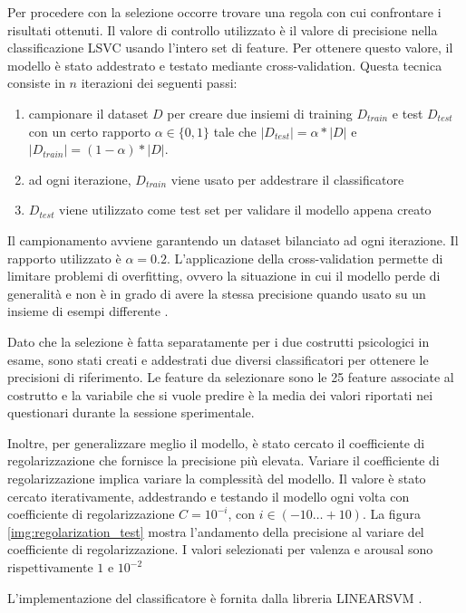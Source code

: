 Per procedere con la selezione occorre trovare una regola con cui confrontare i risultati ottenuti. Il valore di controllo utilizzato è il valore di precisione nella classificazione LSVC usando l'intero set di feature. Per ottenere questo valore, il modello è stato addestrato e testato mediante cross-validation. Questa tecnica consiste in $n$ iterazioni dei seguenti passi:
\begin{enumerate}
    \item campionare il dataset $D$ per creare due insiemi di training $D_{train}$ e test $D_{test}$ con un certo rapporto $\alpha \in\{0,1\}$ tale che $|D_{test}| = \alpha * |D|$ e $|D_{train}| = (1-\alpha) * |D|$.
    \item ad ogni iterazione, $D_{train}$ viene usato per addestrare il classificatore
    \item $D_{test}$ viene utilizzato come test set per validare il modello appena creato
\end{enumerate}
Il campionamento avviene garantendo un dataset bilanciato ad ogni iterazione. Il rapporto utilizzato è $\alpha=0.2$. L'applicazione della cross-validation permette di limitare problemi di overfitting, ovvero la situazione in cui il modello perde di generalità e non è in grado di avere la stessa precisione quando usato su un insieme di esempi differente \cite{arlot2010survey}.

Dato che la selezione è fatta separatamente per i due costrutti psicologici in esame, sono stati creati e addestrati due diversi classificatori per ottenere le precisioni di riferimento. Le feature da selezionare sono le 25 feature associate al costrutto e la variabile che si vuole predire è la media dei valori riportati nei questionari durante la sessione sperimentale.

Inoltre, per generalizzare meglio il modello, è stato cercato il coefficiente di regolarizzazione che fornisce la precisione più elevata. Variare il coefficiente di regolarizzazione implica variare la complessità del modello. Il valore è stato cercato iterativamente, addestrando e testando il modello ogni volta con coefficiente di regolarizzazione $C = 10^{-i}$, con $i\in(-10\dots+10)$. La figura \ref{img:regolarization_test} mostra l'andamento della precisione al variare del coefficiente di regolarizzazione. I valori selezionati per valenza e arousal sono rispettivamente $1$ e $10^{-2}$

L'implementazione del classificatore è fornita dalla libreria LINEARSVM \cite{fan2008liblinear}.

